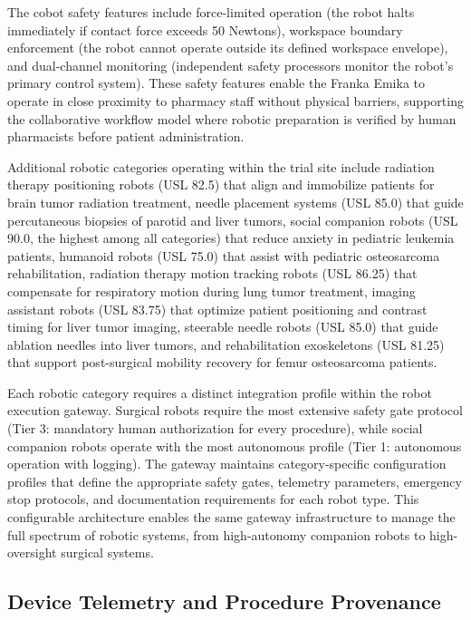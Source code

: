 The cobot safety features include force-limited operation (the robot halts immediately if
contact force exceeds 50 Newtons), workspace boundary enforcement (the robot cannot operate
outside its defined workspace envelope), and dual-channel monitoring (independent safety
processors monitor the robot's primary control system). These safety features enable the
Franka Emika to operate in close proximity to pharmacy staff without physical barriers,
supporting the collaborative workflow model where robotic preparation is verified by human
pharmacists before patient administration.

Additional robotic categories operating within the trial site include radiation therapy
positioning robots (USL 82.5) that align and immobilize patients for brain tumor radiation
treatment, needle placement systems (USL 85.0) that guide percutaneous biopsies of parotid
and liver tumors, social companion robots (USL 90.0, the highest among all categories) that
reduce anxiety in pediatric leukemia patients, humanoid robots (USL 75.0) that assist with
pediatric osteosarcoma rehabilitation, radiation therapy motion tracking robots (USL 86.25)
that compensate for respiratory motion during lung tumor treatment, imaging assistant robots
(USL 83.75) that optimize patient positioning and contrast timing for liver tumor imaging,
steerable needle robots (USL 85.0) that guide ablation needles into liver tumors, and
rehabilitation exoskeletons (USL 81.25) that support post-surgical mobility recovery for
femur osteosarcoma patients.

Each robotic category requires a distinct integration profile within the robot execution
gateway. Surgical robots require the most extensive safety gate protocol (Tier 3: mandatory
human authorization for every procedure), while social companion robots operate with the
most autonomous profile (Tier 1: autonomous operation with logging). The gateway maintains
category-specific configuration profiles that define the appropriate safety gates, telemetry
parameters, emergency stop protocols, and documentation requirements for each robot type.
This configurable architecture enables the same gateway infrastructure to manage the full
spectrum of robotic systems, from high-autonomy companion robots to high-oversight surgical
systems.

\subsection{Device Telemetry and Procedure Provenance}

